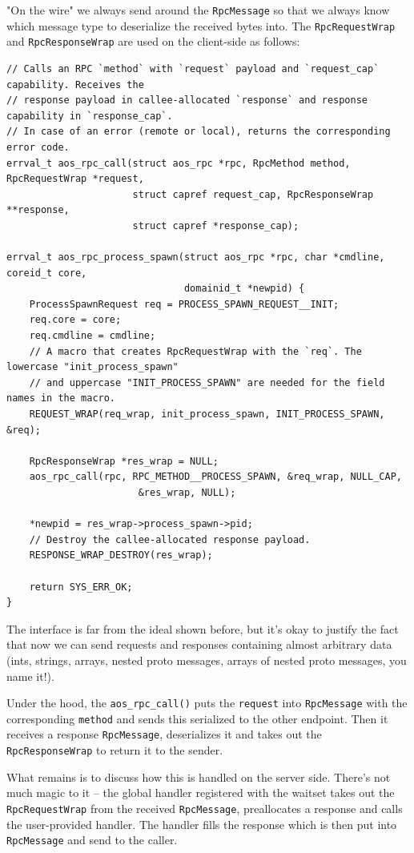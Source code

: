 "On the wire" we always send around the \texttt{RpcMessage} so that we always know which message type to deserialize the received bytes into. The \texttt{RpcRequestWrap} and \texttt{RpcResponseWrap} are used on the client-side as follows:
\begin{verbatim}
// Calls an RPC `method` with `request` payload and `request_cap` capability. Receives the
// response payload in callee-allocated `response` and response capability in `response_cap`.
// In case of an error (remote or local), returns the corresponding error code.
errval_t aos_rpc_call(struct aos_rpc *rpc, RpcMethod method, RpcRequestWrap *request,
                      struct capref request_cap, RpcResponseWrap **response,
                      struct capref *response_cap);

errval_t aos_rpc_process_spawn(struct aos_rpc *rpc, char *cmdline, coreid_t core,
                               domainid_t *newpid) {
    ProcessSpawnRequest req = PROCESS_SPAWN_REQUEST__INIT;
    req.core = core;
    req.cmdline = cmdline;
    // A macro that creates RpcRequestWrap with the `req`. The lowercase "init_process_spawn"
    // and uppercase "INIT_PROCESS_SPAWN" are needed for the field names in the macro.
    REQUEST_WRAP(req_wrap, init_process_spawn, INIT_PROCESS_SPAWN, &req);
    
    RpcResponseWrap *res_wrap = NULL;
    aos_rpc_call(rpc, RPC_METHOD__PROCESS_SPAWN, &req_wrap, NULL_CAP,
                       &res_wrap, NULL);
    
    *newpid = res_wrap->process_spawn->pid;
    // Destroy the callee-allocated response payload.
    RESPONSE_WRAP_DESTROY(res_wrap);

    return SYS_ERR_OK;
}
\end{verbatim}

The interface is far from the ideal shown before, but it's okay to justify the fact that now we can send requests and responses containing almost arbitrary data (ints, strings, arrays, nested proto messages, arrays of nested proto messages, you name it!).

Under the hood, the \texttt{aos_rpc_call()} puts the \texttt{request} into \texttt{RpcMessage} with the corresponding \texttt{method} and sends this serialized to the other endpoint. Then it receives a response \texttt{RpcMessage}, deserializes it and takes out the \texttt{RpcResponseWrap} to return it to the sender. 

What remains is to discuss how this is handled on the server side. There's not much magic to it -- the global handler registered with the waitset takes out the \texttt{RpcRequestWrap} from the received \texttt{RpcMessage}, preallocates a response and calls the user-provided handler. The handler fills the response which is then put into \texttt{RpcMessage} and send to the caller.

